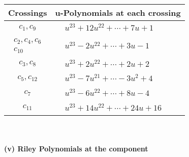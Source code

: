 \documentclass[1p]{elsarticle_modified}
\theoremstyle{definition}
\begin{document}
\begin{tabular}{m{50pt}|m{274pt}}
Crossings & \hspace{64pt}u-Polynomials at each crossing \\
\hline $$\begin{aligned}c_{1},c_{9}\end{aligned}$$&$\begin{aligned}
&u^{23}+12 u^{22}+\cdots+7 u+1
\end{aligned}$\\
\hline $$\begin{aligned}c_{2},c_{4},c_{6}\\c_{10}\end{aligned}$$&$\begin{aligned}
&u^{23}-2 u^{22}+\cdots+3 u-1
\end{aligned}$\\
\hline $$\begin{aligned}c_{3},c_{8}\end{aligned}$$&$\begin{aligned}
&u^{23}+2 u^{22}+\cdots+2 u+2
\end{aligned}$\\
\hline $$\begin{aligned}c_{5},c_{12}\end{aligned}$$&$\begin{aligned}
&u^{23}-7 u^{21}+\cdots-3 u^2+4
\end{aligned}$\\
\hline $$\begin{aligned}c_{7}\end{aligned}$$&$\begin{aligned}
&u^{23}-6 u^{22}+\cdots+8 u-4
\end{aligned}$\\
\hline $$\begin{aligned}c_{11}\end{aligned}$$&$\begin{aligned}
&u^{23}+14 u^{22}+\cdots+24 u+16
\end{aligned}$\\
\hline
\end{tabular}\\~\\
\newpage\renewcommand{\arraystretch}{1}
\flushleft \textbf{(v) Riley Polynomials at the component}\newline \\
\end{document}
